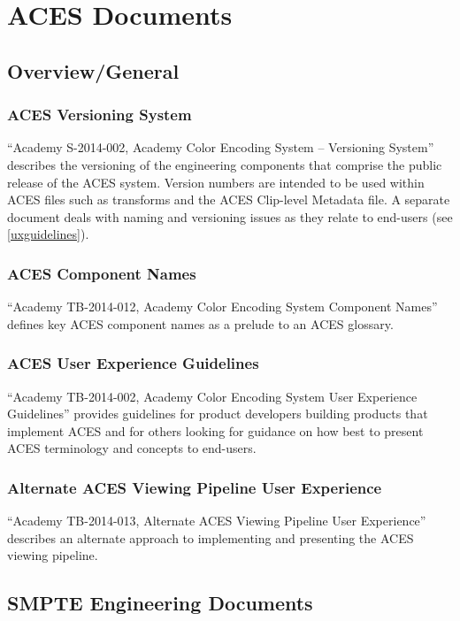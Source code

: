 \regularsectionformat
\chapter{ACES Documents}

\section{Overview/General}
\subsection{ACES Versioning System}
``Academy S-2014-002, Academy Color Encoding System -- Versioning System'' describes the versioning of the engineering components that comprise the public release of the ACES system. Version numbers are intended to be used within ACES files such as transforms and the ACES Clip-level Metadata file. A separate document deals with naming and versioning issues as they relate to end-users (see \autoref{uxguidelines}).

\subsection{ACES Component Names}
``Academy TB-2014-012, Academy Color Encoding System Component Names'' defines key ACES component names as a prelude to an ACES glossary.

\subsection{ACES User Experience Guidelines} \label{uxguidelines}
``Academy TB-2014-002, Academy Color Encoding System User Experience Guidelines'' provides guidelines for product developers building products that implement ACES and for others looking for guidance on how best to present ACES terminology and concepts to end-users.

\subsection{Alternate ACES Viewing Pipeline User Experience}
``Academy TB-2014-013, Alternate ACES Viewing Pipeline User Experience'' describes an alternate approach to implementing and presenting the ACES viewing pipeline. 


\section{SMPTE Engineering Documents}
